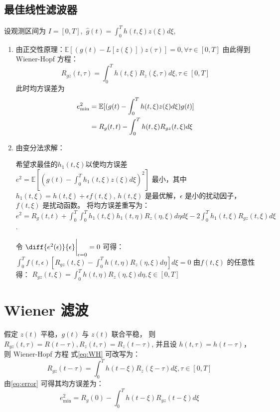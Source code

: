 \documentclass{ctexart}
\numberwithin{equation}{section}
\def\E{\mathbb{E}}
\begin{document}
\subsection{最佳线性滤波器}
设观测区间为 $ I = [0,T],$
$ \hat{g}(t) = \int_0^T h(t,\xi) z(\xi) d\xi $,
\begin{enumerate}
\item 由正交性原理：$\E[(g(t)-L[z(\xi)])z(\tau)]=0,\forall \tau \in [0,T]$
由此得到 Wiener-Hopf 方程： 
\begin{equation}\label{eq:WH}
R_{gz}(t,\tau) = \int_0^T h(t,\xi)R_z(\xi,\tau)d\xi,\tau \in [0,T]
\end{equation}
此时均方误差为
\begin{align}\notag 
e^2_{\min}  & =  \E[(g(t)- \int_0^T h(t,\xi)z(\xi)d\xi)g(t)] \\
 \label{eq:error}& = R_g(t,t) - \int_0^T h(t,\xi) R_{gz}(t,\xi)d\xi
\end{align}
\item 由变分法求解： 

希望求最佳的$h_1(t,\xi)$以使均方误差$ e^2 = \E[(g(t)-\int_0^T h_1(t,\xi)z(\xi)d\xi)^2]$ 最小，其中 $ h_1(t,\xi) = h(t,\xi) + \epsilon f(t,\xi) $,
$h(t,\xi)$ 是最优解，$\epsilon$ 是小的扰动因子， $f(t,\xi)$ 是扰动函数。
将均方误差重写为：$ e^2 = R_g(t,t)+\int_0^T\int_0^T h_1(t,\xi)h_1(t,\eta)R_z(\eta,\xi)d\eta d\xi -2\int_0^T h_1(t,\xi)R_{gz}(t,\xi)d\xi $.

令 $\diff{e^2(\epsilon)}{\epsilon}\bigg\rvert_{\epsilon=0} = 0 $  可得：
$ \int_0^T f(t,\epsilon)[R_{gz}(t,\xi) - \int_0^T h(t,\eta) R_z(\eta, \xi) d\eta ] d\xi = 0 $
由$f(t,\xi)$ 的任意性得：
$ R_{gz}(t,\xi) = \int_0^T h(t,\eta) R_z(\eta, \xi) d\eta,\xi\in [0,T]$
\end{enumerate}
\section{Wiener 滤波}
假定 $z(t)$ 平稳，$g(t)$ 与 $z(t)$ 联合平稳， 则 $R_{gz} (t, \tau) = R(t-\tau), R_z(t,\tau) = R_z(t-\tau)$, 并且设
$ h(t,\tau) = h(t - \tau)$，则 Wiener-Hopf 方程 式\eqref{eq:WH} 可改写为：
\begin{equation}\label{eq:stationary}
R_{gz}(t - \tau) = \int_0^T h(t - \xi)R_z(\xi - \tau)d\xi, \tau \in [0,T]
\end{equation}
由\eqref{eq:error} 可得其均方误差为：
\begin{equation}\label{eq:error_wiener}
    e^2_{\min} = R_g(0) - \int_0^T h(t-\xi) R_{gz}(t-\xi) d\xi
\end{equation}
\end{document}

